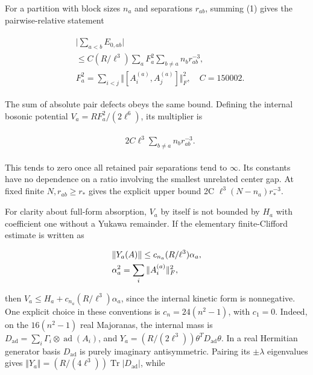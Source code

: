 For a partition with block sizes \(n_{a}\) and separations \(r_{ab}\),
summing (1) gives the pairwise-relative statement

\begin{gather*}
\begin{aligned}
& \vert \sum _{a<b} E_{0,ab}\vert \\
& \le C (R/\ell ^{3})\sum _{a} F_{a}^{2} \sum _{b\ne a}n_{b} r_{ab}^{-3}, \\
& F_{a}^{2}=\sum _{i<j}\Vert [A_{i}^{(a)},A_{j}^{(a)}]\Vert _{F}^{2}, \quad  C=150002.
\end{aligned}\tag{10}
\end{gather*}

The sum of absolute pair defects obeys the same bound. Defining the
internal bosonic potential \(V_{a}=R F_{a}^{2}/(2\ell ^{6})\), its
multiplier is

\begin{gather*}
\begin{aligned}
& 2C \ell ^{3} \sum _{b\ne a}n_{b} r_{ab}^{-3}.
\end{aligned}\tag{11}
\end{gather*}

This tends to zero once all retained pair separations tend to
\(\infty\). Its constants have no dependence on a ratio involving the
smallest unrelated center gap. At fixed finite \(N, r_{ab}\ge r_{*}\)
gives the explicit upper bound 2C \(\ell ^{3}(N-n_{a})r_{*}^{-3}\).

For clarity about full-form absorption, \(V_{a}\) by itself is not
bounded by \(H_{a}\) with coefficient one without a Yukawa remainder. If
the elementary finite-Clifford estimate is written as

\begin{gather*}
\begin{aligned}
& \Vert Y_{a}(A)\Vert \le c_{n_{a}} (R/\ell ^{3}) \alpha _{a}, \\
& \alpha _{a}^{2}=\sum _{i} \Vert A_{i}^{(a)}\Vert _{F}^{2},
\end{aligned}\notag
\end{gather*}

then \(V_{a}\le H_{a}+c_{n_{a}}(R/\ell ^{3})\alpha _{a}\), since the
internal kinetic form is nonnegative. One explicit choice in these
conventions is \(c_{n}=24(n^{2}-1)\), with \(c_{1}=0\). Indeed, on the
\(16(n^{2}-1)\) real Majoranas, the internal mass is
\(D_{\operatorname{ad}}=\sum _{i} \Gamma _{i} \otimes  \operatorname{ad} (A_{i})\),
and \(Y_{a}=(R/(2\ell ^{3}))\theta ^{T} D_{\operatorname{ad}} \theta\).
In a real Hermitian generator basis \(D_{\operatorname{ad}}\) is purely
imaginary antisymmetric. Pairing its \(\pm  \lambda\) eigenvalues gives
\(\Vert Y_{a}\Vert =(R/(4\ell ^{3}))\operatorname{Tr} \vert D_{\operatorname{ad}}\vert\),
while

